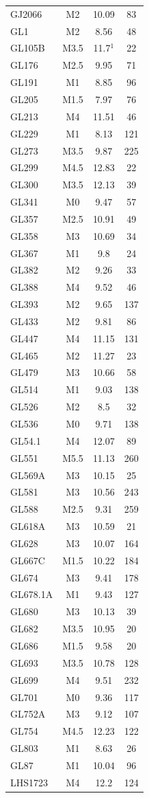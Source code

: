 \begin{longtable}[c]{|l|c|c|c|}
GJ2066	&	M2	&	10.09	&	83	\\
GL1	&	M2	&	8.56	&	48	\\
GL105B	&	M3.5	&	11.7$^1$	&	22	\\
GL176	&	M2.5	&	9.95	&	71	\\
GL191	&	M1	&	8.85	&	96  \\
GL205	&	M1.5	&	7.97	&	76	\\
GL213	&	M4	&	11.51	&	46	\\
GL229	&	M1	&	8.13	&	121	\\
GL273	&	M3.5	&	9.87	&	225	\\
GL299	&	M4.5	&	12.83	&	22	\\
GL300	&	M3.5	&	12.13	&	39	\\
GL341	&	M0	&	9.47	&	57	\\
GL357	&	M2.5	&	10.91	&	49	\\
GL358	&	M3	&	10.69	&	34	\\
GL367	&	M1	&	9.8	&	24	\\
GL382	&	M2	&	9.26	&	33	\\
GL388	&	M4	&	9.52	&	46	\\
GL393	&	M2	&	9.65	&	137	\\
GL433	&	M2	&	9.81	&	86	\\
GL447	&	M4	&	11.15	&	131	\\
GL465	&	M2	&	11.27	&	23	\\
GL479	&	M3	&	10.66	&	58	\\
GL514	&	M1	&	9.03	&	138	\\
GL526	&	M2	&	8.5	&	32	\\
GL536	&	M0	&	9.71	&	138	\\
GL54.1	&	M4	&	12.07	&	89	\\
GL551	&	M5.5	&	11.13	&	260	\\
GL569A	&	M3	&	10.15	&	25	\\
GL581	&	M3	&	10.56	&	243	\\
GL588	&	M2.5	&	9.31	&	259	\\
GL618A	&	M3	&	10.59	&	21	\\
GL628	&	M3	&	10.07	&	164	\\
GL667C	&	M1.5	&	10.22	&	184	\\
GL674	&	M3	&	9.41	&	178	\\
GL678.1A	&	M1	&	9.43	&	127	\\
GL680	&	M3	&	10.13	&	39	\\
GL682	&	M3.5	&	10.95	&	20	\\
GL686	&	M1.5	&	9.58	&	20	\\
GL693	&	M3.5	&	10.78	&	128	\\
GL699	&	M4	&	9.51	&	232	\\
GL701	&	M0	&	9.36	&	117	\\
GL752A	&	M3	&	9.12	&	107	\\
GL754	&	M4.5	&	12.23	&	122	\\
GL803	&	M1	&	8.63	&	26	\\
GL87	&	M1	&	10.04	&	96	\\
LHS1723	&	M4	&	12.2	&	124	\\
\end{longtable}

